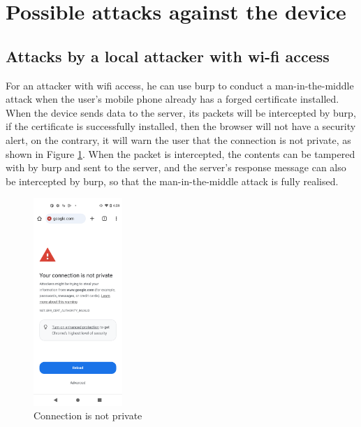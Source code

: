 \documentclass[11pt]{article}
\begin{document}
\section{Possible attacks against the device}

\subsection{Attacks by a local attacker with wi-fi access}

For an attacker with wifi access, he can use burp to conduct a man-in-the-middle attack when the user's mobile phone already has a forged certificate installed. When the device sends data to the server, its packets will be intercepted by burp, if the certificate is successfully installed, then the browser will not have a security alert, on the contrary, it will warn the user that the connection is not private, as shown in Figure \ref{Connection is not private}. When the packet is intercepted, the contents can be tampered with by burp and sent to the server, and the server's response message can also be intercepted by burp, so that the man-in-the-middle attack is fully realised.\par

\begin{figure}[h]
    \centering
    \includegraphics[width=0.3\textwidth]{imgs/MITM.png}
    \caption{Connection is not private}
    \label{Connection is not private}
\end{figure}
\end{document}
